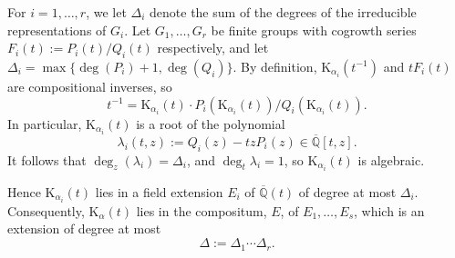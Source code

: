 \documentclass[11pt]{amsart}
\theoremstyle{definition}
\newcommand{\inv}[1]{#1^{-1}}
\newcommand{\CT}{\mathrm{C}}
\newcommand{\invCT}{\mathrm{K}}
\begin{document}
For $i=1,\ldots ,r$, we let $\Delta_i$ denote the sum of the degrees
of the irreducible representations of $G_i$. 
Let $G_1,\ldots ,G_r$ be finite groups with cogrowth series
     $F_i(t):=P_i(t)/Q_i(t)$ respectively, and let $\Delta_i = \max\{\deg (P_i)+1, \deg(Q_i)\}$.
 By definition, $\invCT_{\alpha_i}(\inv{t})$ and $tF_i(t)$ are compositional inverses, so
$$\inv{t}=\invCT_{\alpha_i}(t)\cdot P_i(\invCT_{\alpha_i}(t))/Q_i(\invCT_{\alpha_i}(t)).$$  
In particular, $\invCT_{\alpha_i}(t)$ is a root of the polynomial 
\begin{equation}\label{eq:H}
\lambda_i(t,z):=Q_i(z)  - tz P_i(z)\in \overline{\mathbb{Q}}[t,z].
\end{equation}
It follows that $\deg_z(\lambda_i)= \Delta_i$, and $\deg_t \lambda_i=1$, so $\invCT_{\alpha_i}(t)$ is algebraic.%




Hence $\invCT_{\alpha_i}(t)$ lies in a field extension $E_i$ of $\overline{\mathbb{Q}}(t)$ of degree at most $\Delta_i$.
Consequently, $\invCT_{\alpha}(t)$ lies in the compositum, $E$, of $E_1,\ldots ,E_s$, which is an extension of degree at most \begin{equation}
\Delta:=\Delta_1\cdots \Delta_r.
\end{equation}
\end{document}

